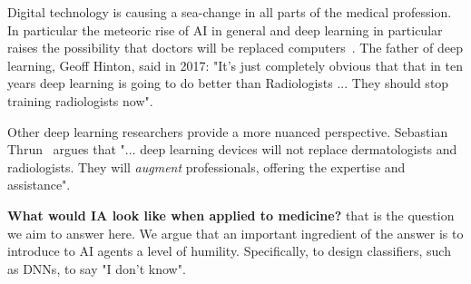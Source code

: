 \documentclass[12pt]{article}
\begin{document}
Digital technology is causing a sea-change in all parts of the medical
profession. In particular the meteoric rise of AI in general and deep
learning in particular raises the possibility that doctors will be
replaced computers~\cite{Mukherjee2017}. The father of deep learning,
Geoff Hinton, said in 2017: "It's just completely obvious that that in
ten years deep learning is going to do better than Radiologists
... They should stop training radiologists now".

Other deep learning researchers provide a more nuanced
perspective. Sebastian
Thrun~\cite{Mukherjee2017,esteva2017dermatologist} argues that
"... deep learning devices will not replace dermatologists and
radiologists. They will {\em augment} professionals, offering the
expertise and assistance".

{\bf What would IA look like when applied to medicine?} that is the
question we aim to answer here.  We argue that an important ingredient
of the answer is to introduce to AI agents a level of
humility. Specifically, to design classifiers, such as DNNs, to say "I
don't know".

\end{document}
